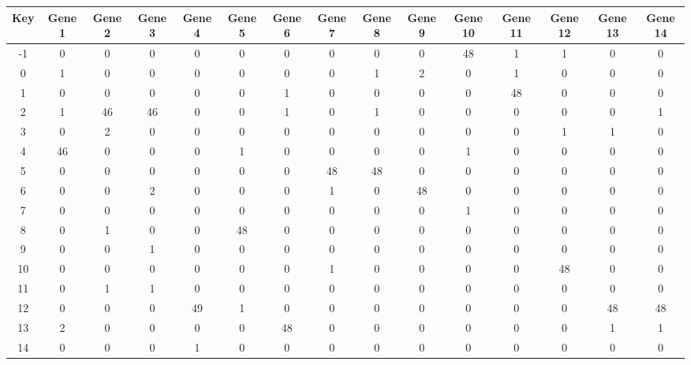 \begin{tabular}{|c|c|c|c|c|c|c|c|c|c|c|c|c|c|c|}
\hline
Key & Gene 1 & Gene 2 & Gene 3 & Gene 4 & Gene 5 & Gene 6 & Gene 7 & Gene 8 & Gene 9 & Gene 10 & Gene 11 & Gene 12 & Gene 13 & Gene 14 \\
\hline
-1 & 0 & 0 & 0 & 0 & 0 & 0 & 0 & 0 & 0 & 48 & 1 & 1 & 0 & 0 \\
0 & 1 & 0 & 0 & 0 & 0 & 0 & 0 & 1 & 2 & 0 & 1 & 0 & 0 & 0 \\
1 & 0 & 0 & 0 & 0 & 0 & 1 & 0 & 0 & 0 & 0 & 48 & 0 & 0 & 0 \\
2 & 1 & 46 & 46 & 0 & 0 & 1 & 0 & 1 & 0 & 0 & 0 & 0 & 0 & 1 \\
3 & 0 & 2 & 0 & 0 & 0 & 0 & 0 & 0 & 0 & 0 & 0 & 1 & 1 & 0 \\
4 & 46 & 0 & 0 & 0 & 1 & 0 & 0 & 0 & 0 & 1 & 0 & 0 & 0 & 0 \\
5 & 0 & 0 & 0 & 0 & 0 & 0 & 48 & 48 & 0 & 0 & 0 & 0 & 0 & 0 \\
6 & 0 & 0 & 2 & 0 & 0 & 0 & 1 & 0 & 48 & 0 & 0 & 0 & 0 & 0 \\
7 & 0 & 0 & 0 & 0 & 0 & 0 & 0 & 0 & 0 & 1 & 0 & 0 & 0 & 0 \\
8 & 0 & 1 & 0 & 0 & 48 & 0 & 0 & 0 & 0 & 0 & 0 & 0 & 0 & 0 \\
9 & 0 & 0 & 1 & 0 & 0 & 0 & 0 & 0 & 0 & 0 & 0 & 0 & 0 & 0 \\
10 & 0 & 0 & 0 & 0 & 0 & 0 & 1 & 0 & 0 & 0 & 0 & 48 & 0 & 0 \\
11 & 0 & 1 & 1 & 0 & 0 & 0 & 0 & 0 & 0 & 0 & 0 & 0 & 0 & 0 \\
12 & 0 & 0 & 0 & 49 & 1 & 0 & 0 & 0 & 0 & 0 & 0 & 0 & 48 & 48 \\
13 & 2 & 0 & 0 & 0 & 0 & 48 & 0 & 0 & 0 & 0 & 0 & 0 & 1 & 1 \\
14 & 0 & 0 & 0 & 1 & 0 & 0 & 0 & 0 & 0 & 0 & 0 & 0 & 0 & 0 \\
\hline
\end{tabular}